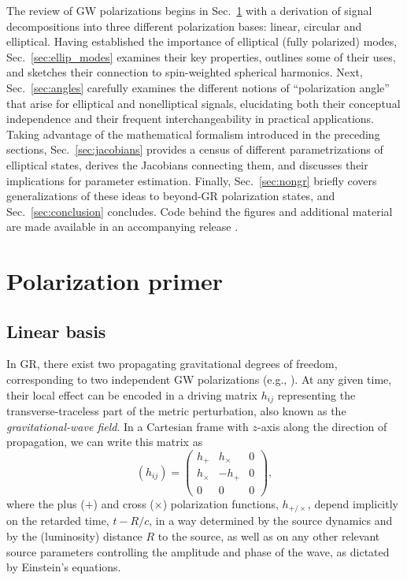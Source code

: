 \documentclass[aps,prd,twocolumn,superscriptaddress,preprintnumbers,floatfix,nofootinbib]{revtex4-2}
\newcommand{\beq}{\begin{equation}}
\newcommand{\eeq}{\end{equation}}
\begin{document}
The review of GW polarizations begins in Sec.~\ref{sec:primer} with a derivation of signal decompositions into three different polarization bases: linear, circular and elliptical.
Having established the importance of elliptical (fully polarized) modes, Sec.~\ref{sec:ellip_modes} examines their key properties, outlines some of their uses, and sketches their connection to spin-weighted spherical harmonics.
Next, Sec.~\ref{sec:angles} carefully examines the different notions of ``polarization angle'' that arise for elliptical and nonelliptical signals, elucidating both their conceptual independence and their frequent interchangeability in practical applications.
Taking advantage of the mathematical formalism introduced in the preceding sections, Sec.~\ref{sec:jacobians} provides a census of different parametrizations of elliptical states, derives the Jacobians connecting them, and discusses their implications for parameter estimation.
Finally, Sec.~\ref{sec:nongr} briefly covers generalizations of these ideas to beyond-GR polarization states, and Sec.~\ref{sec:conclusion} concludes.
Code behind the figures and additional material are made available in an accompanying release \cite{release}.


\section{Polarization primer}
\label{sec:primer}

\subsection{Linear basis}
\label{sec:linear}

In GR, there exist two propagating gravitational degrees of freedom, corresponding to two independent GW polarizations (e.g., \cite{Thorne1983,Thorne:1987af,Poisson2014,BT}).
At any given time, their local effect can be encoded in a driving matrix $h_{ij}$ representing the transverse-traceless part of the metric perturbation, also known as the \emph{gravitational-wave field}.
In a Cartesian frame with $z$-axis along the direction of propagation, we can write this matrix as
\beq \label{eq:hij}
(h_{ij}) = \begin{pmatrix}
h_+ & h_\times  & 0 \\
h_\times  & - h_+ & 0  \\
0 & 0 & 0
\end{pmatrix} ,
\eeq
where the plus ($+$) and cross ($\times$) polarization functions, $h_{+/\times}$, depend implicitly on the retarded time, $t - R/c$, in a way determined by the source dynamics and by the (luminosity) distance $R$ to the source, as well as on any other relevant source parameters controlling the amplitude and phase of the wave, as dictated by Einstein's equations.
\end{document}
